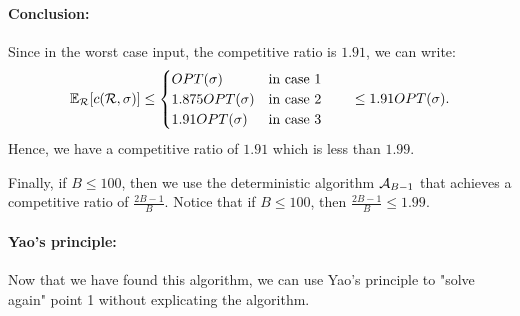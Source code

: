 \documentclass[11pt]{article}
\begin{document}
\begin{enumerate}
    \paragraph*{Conclusion:}
    Since in the worst case input, the competitive ratio is $1.91$, we can write:
    \begin{equation*}
        \mathbb{E}_{\mathcal R}[c(\mathcal{R},\sigma)]  \leq \begin{cases}
            OPT(\sigma) & \text{in case }1\\
            1.875OPT(\sigma) & \text{in case }2\\
            1.91OPT(\sigma) & \text{in case }3
        \end{cases} \qquad\leq 1.91OPT(\sigma).
    \end{equation*}
    Hence, we have a competitive ratio of $1.91$ which is less than $1.99$. 
    
    Finally, if $B\leq 100$, then we use the deterministic algorithm $\mathcal{A}_{B-1}$ that achieves a competitive ratio of $\frac{2B-1}{B}$. Notice that if $B \leq 100$, then $\frac{2B-1}{B} \leq 1.99$.
    \paragraph*{Yao's principle:} Now that we have found this algorithm, we can use Yao's principle to "solve again" point 1 without explicating the algorithm.
\end{enumerate}
\end{document}
